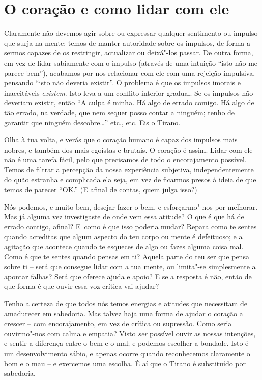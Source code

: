 \section{O coração e como lidar com ele}

Claramente não devemos agir sobre ou expressar qualquer sentimento ou
impulso que surja na mente; temos de manter autoridade sobre os
impulsos, de forma a sermos capazes de os restringir, actualizar ou
deixá"-los passar. De outra forma, em vez de lidar sabiamente com o
impulso (através de uma intuição “isto não me parece bem”), acabamos por
nos relacionar com ele com uma rejeição impulsiva, pensando “isto não
deveria existir”. O problema é que os impulsos imorais e inaceitáveis
\emph{existem}. Isto leva a um conflito interior gradual. Se os impulsos
não deveriam existir, então “A culpa é minha. Há algo de
errado comigo. Há algo de tão errado, na verdade, que nem sequer posso
contar a ninguém; tenho de garantir que ninguém descobre\ldots{}” etc., etc.
Eis o Tirano.

Olha à tua volta, e verás que o coração humano é capaz dos impulsos mais
nobres, e também dos mais egoístas e brutais. O coração é assim. Lidar
com ele não é uma tarefa fácil, pelo que precisamos de todo o
encorajamento possível. Temos de filtrar a percepção da nossa
experiência subjetiva, independentemente do quão estranha e complicada
ela seja, em vez de ficarmos presos à ideia de que temos de parecer
“OK.” (E afinal de contas, quem julga isso?)

Nós podemos, e muito bem, desejar fazer o bem, e esforçarmo"-nos por
melhorar. Mas já alguma vez investigaste de onde vem essa atitude? O que
é que há de errado contigo, afinal? E~como é que isso poderia mudar?
Repara como te sentes quando acreditas que algum aspecto do teu corpo ou
mente é defeituoso; e a agitação que acontece quando te esqueces de algo
ou fazes alguma coisa mal. Como é que te sentes quando pensas em ti?
Aquela parte do teu ser que pensa sobre ti -- será que consegue lidar
com a tua mente, ou limita"-se simplesmente a apontar falhas? Será que
oferece ajuda e apoio? E se a resposta é não, então de que forma é que
ouvir essa voz crítica vai ajudar?

\sectionBreak

Tenho a certeza de que todos nós temos energias e atitudes que
necessitam de amadurecer em sabedoria. Mas talvez haja uma forma de
ajudar o coração a crescer -- com encorajamento, em vez de crítica ou
supressão. Como seria ouvirmo"-nos com calma e empatia? Visto \emph{ser}
possível ouvir as nossas intenções, e sentir a diferença entre o bem e o
mal; e podemos escolher a bondade. Isto é um desenvolvimento sábio, e
apenas ocorre quando reconhecemos claramente o bom e o mau -- e
exercemos uma escolha. É aí que o Tirano é substituído por sabedoria.

